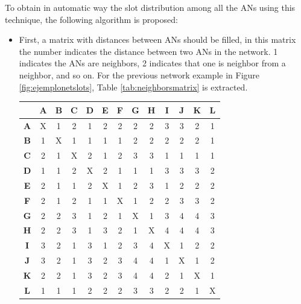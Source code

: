 To obtain in automatic way the slot distribution among all the \acp{AN} using this technique, the following algorithm is proposed:

\begin{itemize}
 \item First, a matrix with distances between \acp{AN} should be filled, in this matrix the number indicates the distance between
two \acp{AN} in the network. 1 indicates the \acp{AN} are neighbors, 2 indicates that one is neighbor from a neighbor, and so on. For 
the previous network example in Figure \ref{fig:ejemplonetslots}, Table \ref{tab:neighborsmatrix} is extracted.

\begin{table}
 \begin{center}
  \begin{tabular}{c|c|c|c|c|c|c|c|c|c|c|c|c|}
   & \textbf{A} & \textbf{B} & \textbf{C} & \textbf{D} & \textbf{E} & \textbf{F} & \textbf{G} & \textbf{H} & \textbf{I} & 
    \textbf{J} & \textbf{K} & \textbf{L} \\
   \hline
   \textbf{A} & X & 1 & 2 & 1 & 2 & 2 & 2 & 2 & 3 & 3 & 2 & 1 \\
   \hline
   \textbf{B} & 1 & X & 1 & 1 & 1 & 1 & 2 & 2 & 2 & 2 & 2 & 1 \\
   \hline
   \textbf{C} & 2 & 1 & X & 2 & 1 & 2 & 3 & 3 & 1 & 1 & 1 & 1 \\
   \hline
   \textbf{D} & 1 & 1 & 2 & X & 2 & 1 & 1 & 1 & 3 & 3 & 3 & 2 \\
   \hline
   \textbf{E} & 2 & 1 & 1 & 2 & X & 1 & 2 & 3 & 1 & 2 & 2 & 2 \\
   \hline
   \textbf{F} & 2 & 1 & 2 & 1 & 1 & X & 1 & 2 & 2 & 3 & 3 & 2 \\
   \hline
   \textbf{G} & 2 & 2 & 3 & 1 & 2 & 1 & X & 1 & 3 & 4 & 4 & 3 \\
   \hline
   \textbf{H} & 2 & 2 & 3 & 1 & 3 & 2 & 1 & X & 4 & 4 & 4 & 3 \\
   \hline
   \textbf{I} & 3 & 2 & 1 & 3 & 1 & 2 & 3 & 4 & X & 1 & 2 & 2 \\
   \hline
   \textbf{J} & 3 & 2 & 1 & 3 & 2 & 3 & 4 & 4 & 1 & X & 1 & 2 \\
   \hline
   \textbf{K} & 2 & 2 & 1 & 3 & 2 & 3 & 4 & 4 & 2 & 1 & X & 1 \\
   \hline
   \textbf{L} & 1 & 1 & 1 & 2 & 2 & 2 & 3 & 3 & 2 & 2 & 1 & X \\
   \hline
  \end{tabular}

\end{center}
\end{table}
\end{itemize}
